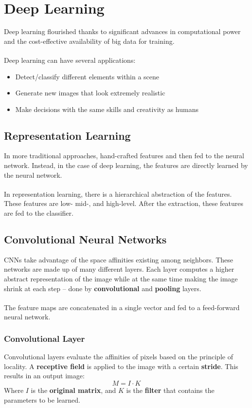 \documentclass{article}
\begin{document}
\section{Deep Learning}
Deep learning flourished thanks to significant advances in computational power and the cost-effective availability of big data for training. \\ \\
Deep learning can have several applications:

\begin{itemize}
	\item Detect/classify different elements within a scene
	\item Generate new images that look extremely realistic
	\item Make decisions with the same skills and creativity as humans
\end{itemize}
\subsection{Representation Learning}
In more traditional approaches, hand-crafted features and then fed to the neural network. Instead, in the case of deep learning, the features are directly learned by the neural network. \\ \\
In representation learning, there is a hierarchical abstraction of the features. These features are low- mid-, and high-level. After the extraction, these features are fed to the classifier.

\subsection{Convolutional Neural Networks}
CNNs take advantage of the space affinities existing among neighbors. These networks are made up of many different layers. Each layer computes a higher abstract representation of the image while at the same time making the image shrink at each step -- done by \textbf{convolutional} and \textbf{pooling} layers. \\ \\
The feature maps are concatenated in a single vector and fed to a feed-forward neural network.

\subsubsection{Convolutional Layer}
Convolutional layers evaluate the affinities of pixels based on the principle of locality. A \textbf{receptive field} is applied to the image with a certain \textbf{stride}. This results in an output image:
\[ M = I \cdot K \]
Where $I$ is the \textbf{original matrix}, and $K$ is the \textbf{filter} that contains the parameters to be learned.
\end{document}
